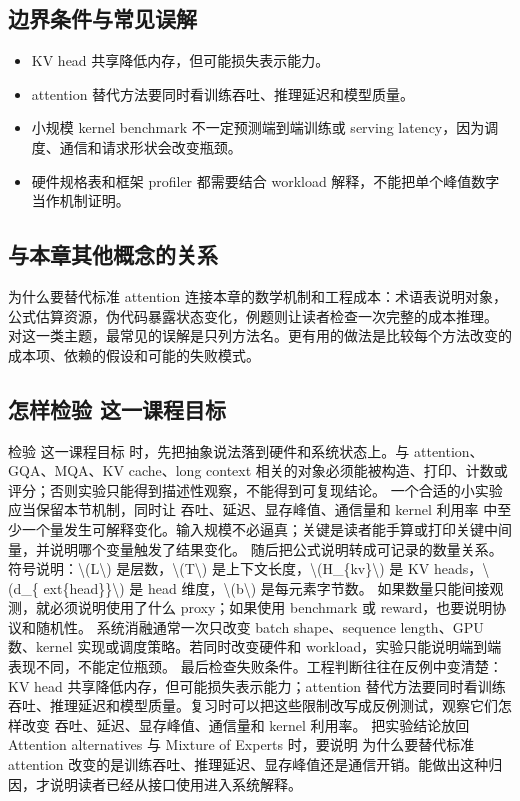 \documentclass[a4paper]{article}
\begin{document}
\subsection{边界条件与常见误解}
\begin{itemize}
\item KV head 共享降低内存，但可能损失表示能力。
\item attention 替代方法要同时看训练吞吐、推理延迟和模型质量。
\item 小规模 kernel benchmark 不一定预测端到端训练或 serving latency，因为调度、通信和请求形状会改变瓶颈。
\item 硬件规格表和框架 profiler 都需要结合 workload 解释，不能把单个峰值数字当作机制证明。
\end{itemize}
\subsection{与本章其他概念的关系}
为什么要替代标准 attention 连接本章的数学机制和工程成本：术语表说明对象，公式估算资源，伪代码暴露状态变化，例题则让读者检查一次完整的成本推理。
对这一类主题，最常见的误解是只列方法名。更有用的做法是比较每个方法改变的成本项、依赖的假设和可能的失败模式。
\subsection{怎样检验 这一课程目标}
检验 这一课程目标 时，先把抽象说法落到硬件和系统状态上。与 attention、GQA、MQA、KV cache、long context 相关的对象必须能被构造、打印、计数或评分；否则实验只能得到描述性观察，不能得到可复现结论。
一个合适的小实验应当保留本节机制，同时让 吞吐、延迟、显存峰值、通信量和 kernel 利用率 中至少一个量发生可解释变化。输入规模不必逼真；关键是读者能手算或打印关键中间量，并说明哪个变量触发了结果变化。
随后把公式说明转成可记录的数量关系。符号说明：\textbackslash{}(L\textbackslash{}) 是层数，\textbackslash{}(T\textbackslash{}) 是上下文长度，\textbackslash{}(H\_\{kv\}\textbackslash{}) 是 KV heads，\textbackslash{}(d\_\{ ext\{head\}\}\textbackslash{}) 是 head 维度，\textbackslash{}(b\textbackslash{}) 是每元素字节数。 如果数量只能间接观测，就必须说明使用了什么 proxy；如果使用 benchmark 或 reward，也要说明协议和随机性。
系统消融通常一次只改变 batch shape、sequence length、GPU 数、kernel 实现或调度策略。若同时改变硬件和 workload，实验只能说明端到端表现不同，不能定位瓶颈。
最后检查失败条件。工程判断往往在反例中变清楚：KV head 共享降低内存，但可能损失表示能力；attention 替代方法要同时看训练吞吐、推理延迟和模型质量。复习时可以把这些限制改写成反例测试，观察它们怎样改变 吞吐、延迟、显存峰值、通信量和 kernel 利用率。
把实验结论放回 Attention alternatives 与 Mixture of Experts 时，要说明 为什么要替代标准 attention 改变的是训练吞吐、推理延迟、显存峰值还是通信开销。能做出这种归因，才说明读者已经从接口使用进入系统解释。
\end{document}
